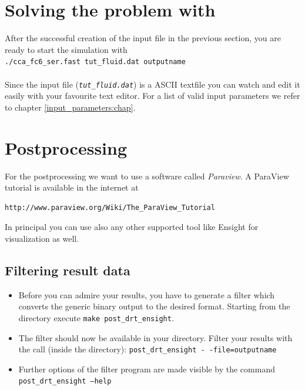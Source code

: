 \section{Solving the problem with \baci{}}

After the successful creation of the input file in the previous section,
you are ready to start the simulation with \\
\texttt{./cca\_fc6\_ser.fast tut\_fluid.dat outputname} 
\\
\\
Since the input file (\texttt{\emph{tut\_fluid.dat}}) is a ASCII textfile you can
watch and edit it easily with your favourite text editor. For a list of valid input parameters
we refer to chapter \ref{input_parameters:chap}.
\section{Postprocessing}

For the postprocessing we want to use a software called \emph{Paraview}. 
A ParaView tutorial is available in the internet at
\begin{verbatim}
http://www.paraview.org/Wiki/The_ParaView_Tutorial
\end{verbatim}
In principal you can use also any other supported tool like Ensight for visualization as well. 

\subsection{Filtering result data}
\begin{itemize}
\item Before you can admire your results, you have to generate a filter 
which converts the generic binary \baci{} output to the desired format.
Starting from the \baci{} directory execute \texttt{make post\_drt\_ensight}.
\item The filter should now be available in your \baci{} directory. Filter your results with
the call (inside the \baci{} directory): \texttt{post\_drt\_ensight -\,-file=outputname} 
\item Further options of the filter program are made visible by the command \texttt{post\_drt\_ensight --help}
\end{itemize}

